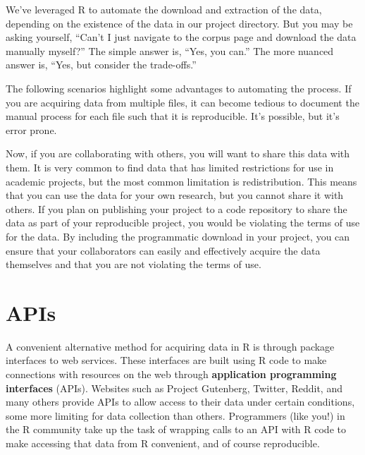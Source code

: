 \documentclass[
  letterpaper,
  krantz1]{latex/krantz-mod}
\theoremstyle{definition}
\theoremstyle{definition}
\theoremstyle{remark}
\begin{document}
We've leveraged R to automate the download and extraction of the data,
depending on the existence of the data in our project directory. But you
may be asking yourself, ``Can't I just navigate to the corpus page and
download the data manually myself?'' The simple answer is, ``Yes, you
can.'' The more nuanced answer is, ``Yes, but consider the trade-offs.''

The following scenarios highlight some advantages to automating the
process. If you are acquiring data from multiple files, it can become
tedious to document the manual process for each file such that it is
reproducible. It's possible, but it's error prone.

Now, if you are collaborating with others, you will want to share this
data with them. It is very common to find data that has limited
restrictions for use in academic projects, but the most common
limitation is redistribution. This means that you can use the data for
your own research, but you cannot share it with
others. If you plan on publishing your project to a
code repository to share the data as part of your reproducible project,
you would be violating the terms of use for the
data. By including the programmatic
download in your project, you can ensure that your collaborators can
easily and effectively acquire the data themselves and that you are not
violating the terms of use.

\section{APIs}\label{sec-apis}

A convenient alternative method for acquiring data in R is
through package interfaces to web services. These interfaces are built
using R code to make connections with resources on the web through
\textbf{application programming interfaces}
(APIs). Websites such as
Project Gutenberg, Twitter, Reddit, and many others provide APIs to
allow access to their data under certain conditions, some more limiting
for data collection than others. Programmers (like you!) in the R
community take up the task of wrapping calls to an
API with R code to make accessing that data from R convenient, and of
course reproducible.
\end{document}
